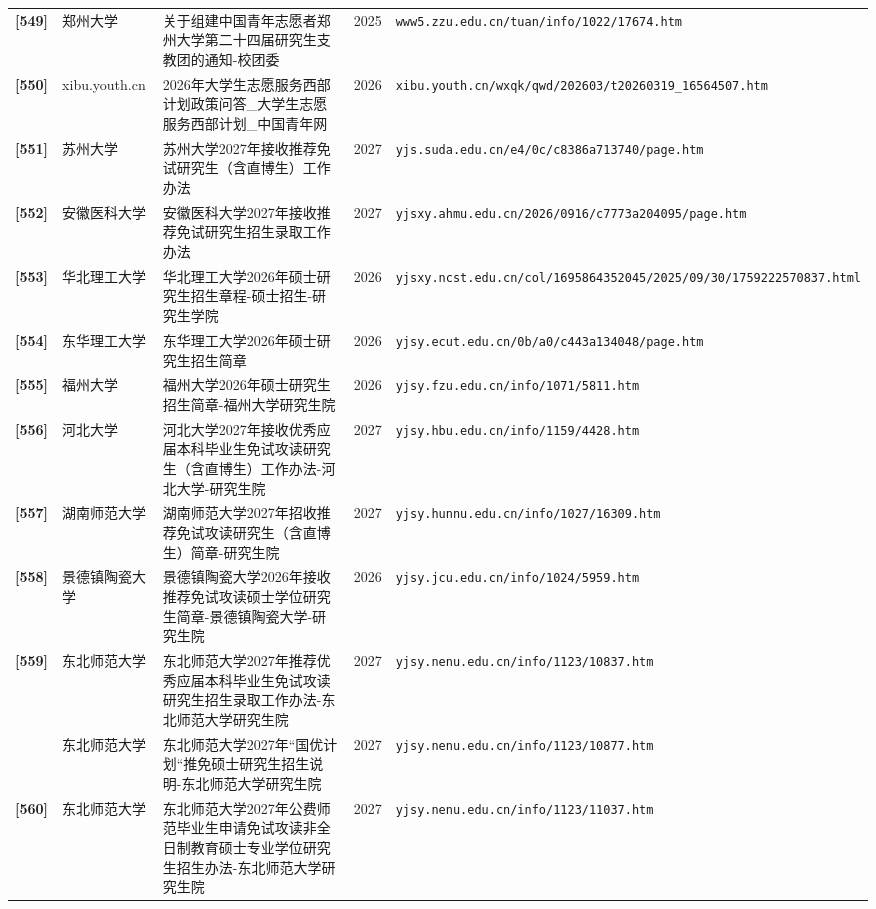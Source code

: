 {\begin{longtable}{@{}p{1.15cm}p{2.9cm}p{6.3cm}p{0.85cm}p{5.0cm}@{}}
\textbf{[549]} & 郑州大学 & 关于组建中国青年志愿者郑州大学第二十四届研究生支教团的通知-校团委 & 2025 & \texttt{www5.zzu.edu.cn/tuan/info/1022/17674.htm} \\
\textbf{[550]} & xibu.youth.cn & 2026年大学生志愿服务西部计划政策问答\_大学生志愿服务西部计划\_中国青年网 & 2026 & \texttt{xibu.youth.cn/wxqk/qwd/202603/t20260319\_16564507.htm} \\
\textbf{[551]} & 苏州大学 & 苏州大学2027年接收推荐免试研究生（含直博生）工作办法 & 2027 & \texttt{yjs.suda.edu.cn/e4/0c/c8386a713740/page.htm} \\
\textbf{[552]} & 安徽医科大学 & 安徽医科大学2027年接收推荐免试研究生招生录取工作办法 & 2027 & \texttt{yjsxy.ahmu.edu.cn/2026/0916/c7773a204095/page.htm} \\
\textbf{[553]} & 华北理工大学 & 华北理工大学2026年硕士研究生招生章程-硕士招生-研究生学院 & 2026 & \texttt{yjsxy.ncst.edu.cn/col/1695864352045/2025/09/30/1759222570837.html} \\
\textbf{[554]} & 东华理工大学 & 东华理工大学2026年硕士研究生招生简章 & 2026 & \texttt{yjsy.ecut.edu.cn/0b/a0/c443a134048/page.htm} \\
\textbf{[555]} & 福州大学 & 福州大学2026年硕士研究生招生简章-福州大学研究生院 & 2026 & \texttt{yjsy.fzu.edu.cn/info/1071/5811.htm} \\
\textbf{[556]} & 河北大学 & 河北大学2027年接收优秀应届本科毕业生免试攻读研究生（含直博生）工作办法-河北大学-研究生院 & 2027 & \texttt{yjsy.hbu.edu.cn/info/1159/4428.htm} \\
\textbf{[557]} & 湖南师范大学 & 湖南师范大学2027年招收推荐免试攻读研究生（含直博生）简章-研究生院 & 2027 & \texttt{yjsy.hunnu.edu.cn/info/1027/16309.htm} \\
\textbf{[558]} & 景德镇陶瓷大学 & 景德镇陶瓷大学2026年接收推荐免试攻读硕士学位研究生简章-景德镇陶瓷大学-研究生院 & 2026 & \texttt{yjsy.jcu.edu.cn/info/1024/5959.htm} \\
\textbf{[559]} & 东北师范大学 & 东北师范大学2027年推荐优秀应届本科毕业生免试攻读研究生招生录取工作办法-东北师范大学研究生院 & 2027 & \texttt{yjsy.nenu.edu.cn/info/1123/10837.htm} \\
[0] & 东北师范大学 & 东北师范大学2027年“国优计划“推免硕士研究生招生说明-东北师范大学研究生院 & 2027 & \texttt{yjsy.nenu.edu.cn/info/1123/10877.htm} \\
\textbf{[560]} & 东北师范大学 & 东北师范大学2027年公费师范毕业生申请免试攻读非全日制教育硕士专业学位研究生招生办法-东北师范大学研究生院 & 2027 & \texttt{yjsy.nenu.edu.cn/info/1123/11037.htm} \\

\end{longtable}}
